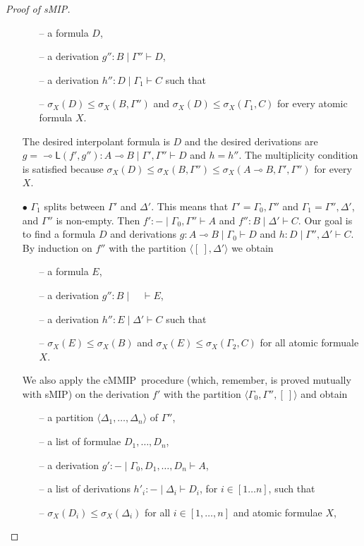 \documentclass[sn-mathphys-num]{sn-jnl}%
\newcommand{\GG}{\Gamma}
\newcommand{\GD}{\Delta}
\newcommand{\vd}{\vdash}
\newcommand{\lolli}{\multimap}
\newcommand{\lleft}{{\lolli}\mathsf{L}}
\newcommand{\gs}[1]{\sigma_{X} (#1)}
\newcommand{\sMIP}{\textsf{sMIP}}
\newcommand{\cMMIP}{\textsf{cMMIP}}
\theoremstyle{thmstyleone}%
\theoremstyle{thmstyletwo}%
\theoremstyle{thmstylethree}%
\begin{document}
\begin{proof}[Proof of \sMIP]
\begin{itemize}
\begin{itemize}
\item[--]  a formula $D$,
\item[--] a derivation $g'' : B \mid \GG'' \vd D$,
\item[--] a derivation $h'' : D \mid \GG_1 \vd C$ such that 
\item[--] $\gs{D} \leq \gs{B , \GG''}$ and $ \gs{D} \leq \gs{\GG_1 , C}$ for every atomic formula $X$.
\end{itemize}
The desired interpolant formula is $D$ and the desired derivations are $g = \lleft (f' , g'') : A \lolli B \mid \GG' , \GG'' \vd D$ and $h = h''$.
The multiplicity condition is satisfied because $\gs{D} \leq \gs{B , \GG''} \leq \gs{A \lolli B , \GG' , \GG''}$ for every $X$.

\item[$\bullet$] $\Gamma_1$ splits between $\Gamma'$ and $\Delta'$. 
This means that $\Gamma' = \GG_0,\GG''$ and $\GG_1 = \GG'',\Delta'$, and $\GG''$ is non-empty.
Then $f' : {-} \mid \GG_0,\GG'' \vd A$ and $f'': B \mid \Delta' \vd C$.
Our goal is to find a formula $D$ and derivations $g : A\lolli B \mid \GG_0 \vd D$ and $h: D \mid \GG'', \Delta' \vd C$.
By induction on $f''$ with the partition $\langle [\ ] , \Delta' \rangle$ we obtain
\begin{itemize}
\item[--] a formula $E$,
\item[--] a derivation $g'' : B \mid \quad \vd E$,
\item[--] a derivation $h'': E \mid \Delta' \vd C$ such that
\item[--] $\gs{E} \leq\gs{B}$ and $ \gs{E} \leq \gs{\GG_2 , C}$ for all atomic formuale $X$.
\end{itemize}
We also apply the \cMMIP~procedure (which, remember, is proved mutually with \sMIP) on the derivation $f'$ with the partition $\langle \GG_0 , \GG'' , [\ ]\rangle$ and obtain
\begin{itemize}
\item[--]  a partition $\langle \GD_1, \dots , \GD_n \rangle$ of $\GG''$,
\item[--] a list of formulae $D_1 , \dots , D_n$,
  \item[--] a derivation $g': {-} \mid \GG_0 , D_1, \dots, D_n \vd A$,
  \item[--] a list of derivations $h'_i : {-} \mid \GD_i \vd D_i$, for $i \in [1\dots n]$, such that
  \item[--] $\gs{D_i} \leq \gs{\GD_i}$ for all $i \in [1, \dots, n]$ and atomic formulae $X$,

\end{itemize}
\end{itemize}
\end{proof}
\end{document}

